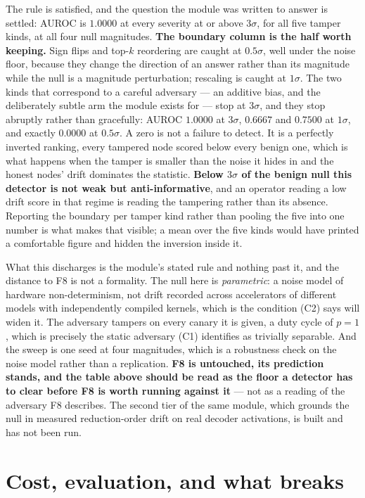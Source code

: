 \documentclass[11pt]{article}
\begin{document}
The rule is satisfied, and the question the module was written to answer is settled: AUROC is $1.0000$ at every severity at or above $3\sigma$, for all five tamper kinds, at all four null magnitudes. \textbf{The boundary column is the half worth keeping.} Sign flips and top-$k$ reordering are caught at $0.5\sigma$, well under the noise floor, because they change the direction of an answer rather than its magnitude while the null is a magnitude perturbation; rescaling is caught at $1\sigma$. The two kinds that correspond to a careful adversary --- an additive bias, and the deliberately subtle arm the module exists for --- stop at $3\sigma$, and they stop abruptly rather than gracefully: AUROC $1.0000$ at $3\sigma$, $0.6667$ and $0.7500$ at $1\sigma$, and exactly $0.0000$ at $0.5\sigma$. A zero is not a failure to detect. It is a perfectly inverted ranking, every tampered node scored below every benign one, which is what happens when the tamper is smaller than the noise it hides in and the honest nodes' drift dominates the statistic. \textbf{Below $3\sigma$ of the benign null this detector is not weak but anti-informative}, and an operator reading a low drift score in that regime is reading the tampering rather than its absence. Reporting the boundary per tamper kind rather than pooling the five into one number is what makes that visible; a mean over the five kinds would have printed a comfortable figure and hidden the inversion inside it.

What this discharges is the module's stated rule and nothing past it, and the distance to F8 is not a formality. The null here is \emph{parametric}: a noise model of hardware non-determinism, not drift recorded across accelerators of different models with independently compiled kernels, which is the condition (C2) says will widen it. The adversary tampers on every canary it is given, a duty cycle of $p = 1$, which is precisely the static adversary (C1) identifies as trivially separable. And the sweep is one seed at four magnitudes, which is a robustness check on the noise model rather than a replication. \textbf{F8 is untouched, its prediction stands, and the table above should be read as the floor a detector has to clear before F8 is worth running against it} --- not as a reading of the adversary F8 describes. The second tier of the same module, which grounds the null in measured reduction-order drift on real decoder activations, is built and has not been run.

\section{Cost, evaluation, and what breaks}
\label{sec:cost}
\end{document}
